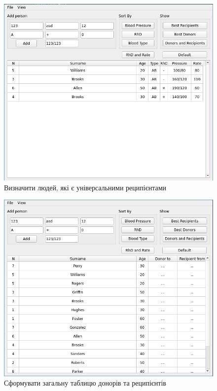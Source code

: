 \documentclass[oneside,14pt]{extarticle}
\begin{document}
\begin{figure}[H]
	\centering
	\includegraphics[scale=0.7]{9}
	\caption{Визначити людей, які є універсальними реципієнтами}
\end{figure}

\begin{figure}[H]
	\centering
	\includegraphics[scale=0.7]{10}
	\caption{Сформувати загальну таблицю донорів та реципієнтів}
\end{figure}
\end{document}
